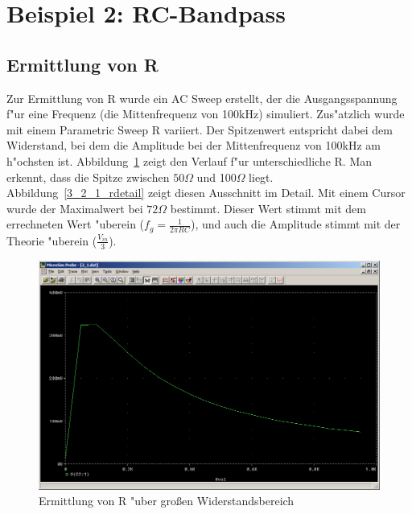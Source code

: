 \section{Beispiel 2: RC-Bandpass}

\subsection{Ermittlung von R}

Zur Ermittlung von R wurde ein AC Sweep erstellt, der die Ausgangsspannung f"ur eine Frequenz (die Mittenfrequenz von 100kHz) simuliert. Zus"atzlich wurde mit einem Parametric Sweep R variiert. Der Spitzenwert entspricht dabei dem Widerstand, bei dem die Amplitude bei der Mittenfrequenz von 100kHz am h"ochsten ist. Abbildung~\ref{fig:3_2_1_rgrob} zeigt den Verlauf f"ur unterschiedliche R. Man erkennt, dass die Spitze zwischen $50\Omega$ und 100$\Omega$ liegt. Abbildung~\ref{3_2_1_rdetail} zeigt diesen Ausschnitt im Detail. Mit einem Cursor wurde der Maximalwert bei $72\Omega$ bestimmt. Dieser Wert stimmt mit dem errechneten Wert "uberein ($f_g = \frac{1}{2 \pi R C}$), und auch die Amplitude stimmt mit der Theorie "uberein ($\frac{V_{in}}{3}$).

\begin{figure}%
	\centering
	\includegraphics[width=\textwidth]{fig/bsp2/3_2_1_rgrob.PNG}
	\caption{Ermittlung von R "uber gro\ss{}en Widerstandsbereich}
	\label{fig:3_2_1_rgrob}
\end{figure}


